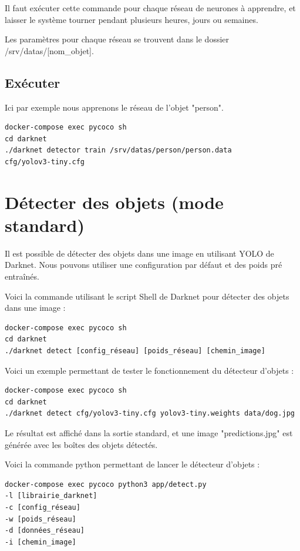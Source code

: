 \documentclass[debug,nodate,hideweeklyreports]{polytech/polytech}
\begin{document}
Il faut exécuter cette commande pour chaque réseau de neurones à apprendre, et laisser le système tourner pendant plusieurs heures, jours ou semaines.

Les paramètres pour chaque réseau se trouvent dans le dossier /srv/datas/[nom\_objet].

\subsection{Exécuter}

Ici par exemple nous apprenons le réseau de l'objet "person".
\begin{lstlisting}
docker-compose exec pycoco sh
cd darknet
./darknet detector train /srv/datas/person/person.data 
cfg/yolov3-tiny.cfg
\end{lstlisting}

\section{Détecter des objets (mode standard)}

Il est possible de détecter des objets dans une image en utilisant YOLO de Darknet. Nous pouvons utiliser une configuration par défaut et des poids pré entraînés.

Voici la commande utilisant le script Shell de Darknet pour détecter des objets dans une image :

\begin{lstlisting}
docker-compose exec pycoco sh
cd darknet
./darknet detect [config_réseau] [poids_réseau] [chemin_image]
\end{lstlisting}

Voici un exemple permettant de tester le fonctionnement du détecteur d'objets :

\begin{lstlisting}
docker-compose exec pycoco sh
cd darknet
./darknet detect cfg/yolov3-tiny.cfg yolov3-tiny.weights data/dog.jpg
\end{lstlisting}

Le résultat est affiché dans la sortie standard, et une image "predictions.jpg" est générée avec les boîtes des objets détectés.

Voici la commande python permettant de lancer le détecteur d'objets :

\begin{lstlisting}
docker-compose exec pycoco python3 app/detect.py 
-l [librairie_darknet] 
-c [config_réseau] 
-w [poids_réseau] 
-d [données_réseau] 
-i [chemin_image]
\end{lstlisting}
\end{document}
